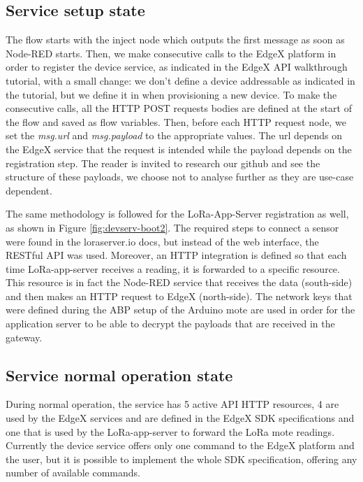 \subsection{Service setup state}
The flow starts with the inject node which outputs the first message as soon as Node-RED starts. Then, we make consecutive calls to the EdgeX platform in order to register the device service, as indicated in the EdgeX API walkthrough tutorial, with a small change: we don’t define a device addressable as indicated in the tutorial, but we define it in when provisioning a new device. To make the consecutive calls, all the HTTP POST requests bodies are defined at the start of the flow and saved as flow variables. Then, before each HTTP request node, we set the \textit{msg.url} and \textit{msg.payload} to the appropriate values. The url depends on the EdgeX service that the request is intended while the payload depends on the registration step. The reader is invited to research our github and see the structure of these payloads, we choose not to analyse further as they are use-case dependent. 

The same methodology is followed for the LoRa-App-Server registration as well, as shown in Figure \ref{fig:devserv-boot2}. The required steps to connect a sensor were found in the loraserver.io docs, but instead of the web interface, the RESTful API was used. Moreover, an HTTP integration is defined so that each time LoRa-app-server receives a reading, it is forwarded to a specific resource. This resource is in fact the Node-RED service that receives the data (south-side) and then makes an HTTP request to EdgeX (north-side). The network keys that were defined during the ABP setup of the Arduino mote are used in order for the application server to be able to decrypt the payloads that are received in the gateway.

\subsection{Service normal operation state}
During normal operation, the service has 5 active API HTTP resources, 4 are used by the EdgeX services and are defined in the EdgeX SDK specifications and one that is used by the LoRa-app-server to forward the LoRa mote readings. Currently the device service offers only one command to the EdgeX platform and the user, but it is possible to implement the whole SDK specification, offering any number of available commands.

